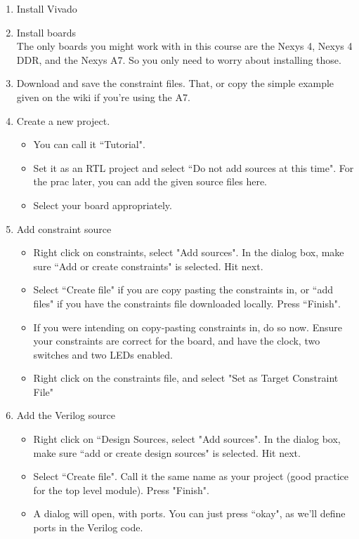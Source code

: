\begin{enumerate}
    \item Install Vivado
    \item Install boards\\
    The only boards you might work with in this course are the Nexys 4, Nexys 4 DDR, and the Nexys A7. So you only need to worry about installing those.
    \item Download and save the constraint files. That, or copy the simple example given on the wiki if you're using the A7.
    \item Create a new project. 
    \begin{itemize}
        \item You can call it ``Tutorial".
        \item Set it as an RTL project and select ``Do not add sources at this time". For the prac later, you can add the given source files here.
        \item Select your board appropriately.
    \end{itemize}
    \item Add constraint source
    \begin{itemize}
        \item Right click on constraints, select "Add sources". In the dialog box, make sure ``Add or create constraints" is selected. Hit next.
        \item Select ``Create file" if you are copy pasting the constraints in, or ``add files" if you have the constraints file downloaded locally. Press ``Finish".
        \item If you were intending on copy-pasting constraints in, do so now. Ensure your constraints are correct for the board, and have the clock, two switches and two LEDs enabled.
        \item Right click on the constraints file, and select "Set as Target Constraint File"
    \end{itemize}
    \item Add the Verilog source
    \begin{itemize}
        \item Right click on ``Design Sources, select "Add sources". In the dialog box, make sure ``add or create design sources" is selected. Hit next.
        \item Select ``Create file". Call it the same name as your project (good practice for the top level module). Press "Finish".
        \item A dialog will open, with ports. You can just press ``okay", as we'll define ports in the Verilog code.

\end{itemize}
\end{enumerate}

